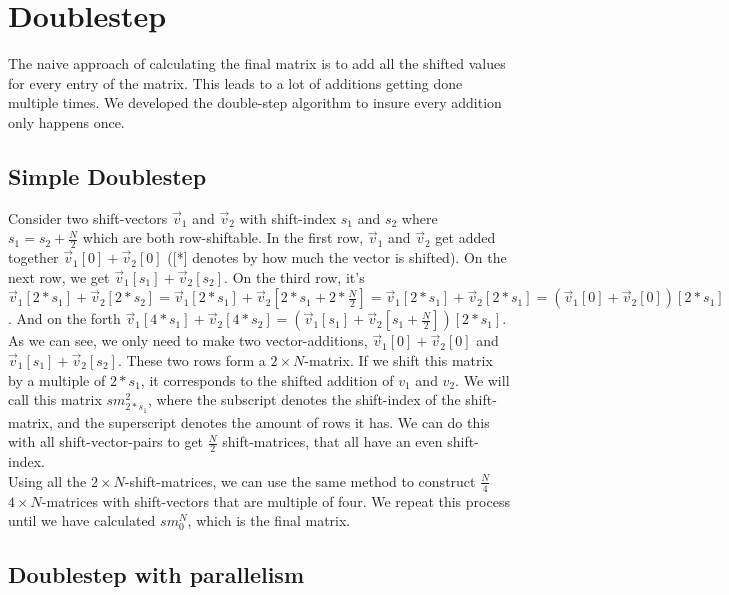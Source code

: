 \documentclass[12pt]{article}
\begin{document}
\section{ Doublestep }

The naive approach of calculating the final matrix is to add all the shifted values for every entry of the matrix. This leads to a lot of additions getting done multiple times. We developed the double-step algorithm to insure every addition only happens once.

\subsection{ Simple Doublestep }

Consider two shift-vectors $\vec{v}_1$ and $\vec{v}_2$ with shift-index $s_1$ and $s_2$ where $s_1 = s_2+\frac{N}{2}$ which are both row-shiftable. In the first row, $\vec{v}_1$ and $\vec{v}_2$ get added together $\vec{v}_1[0]+\vec{v}_2[0]$ ([*] denotes by how much the vector is shifted). On the next row, we get $\vec{v}_1[s_1]+\vec{v}_2[s_2]$. On the third row, it's $\vec{v}_1[2*s_1]+\vec{v}_2[2*s_2] = \vec{v}_1[2*s_1]+\vec{v}_2[2*s_1+2*\frac{N}{2}] = \vec{v}_1[2*s_1]+\vec{v}_2[2*s_1] = (\vec{v}_1[0]+\vec{v}_2[0])[2*s_1] $. And on the forth $\vec{v}_1[4*s_1]+\vec{v}_2[4*s_2] = (\vec{v}_1[s_1]+\vec{v}_2[s_1 +\frac{N}{2}])[2*s_1]$.\\

As we can see, we only need to make two vector-additions, $\vec{v}_1[0]+\vec{v}_2[0]$ and $\vec{v}_1[s_1]+\vec{v}_2[s_2]$. These two rows form a $2\times N$-matrix. If we shift this matrix by a multiple of $2*s_1$, it corresponds to the shifted addition of $v_1$ and $v_2$. We will call this matrix $sm_{2*s_1}^2$, where the subscript denotes the shift-index of the shift-matrix, and the superscript denotes the amount of rows it has. We can do this with all shift-vector-pairs to get $\frac{N}{2}$ shift-matrices, that all have an even shift-index.\\

Using all the $2\times N$-shift-matrices, we can use the same method to construct $\frac{N}{4}$ $4\times N$-matrices with shift-vectors that are multiple of four. We repeat this process until we have calculated $sm_{0}^N$, which is the final matrix.

\subsection{ Doublestep with parallelism }
\end{document}
